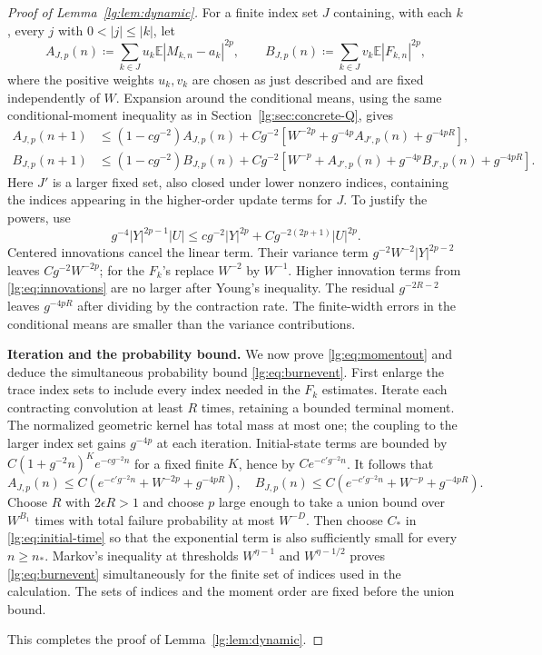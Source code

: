 \documentclass[11pt]{article}
\numberwithin{equation}{section}
\theoremstyle{remark}
\newcommand{\E}{\mathbb E}
\begin{document}
\begin{proof}[Proof of Lemma~\ref{lg:lem:dynamic}]
For a finite index set $J$ containing, with each $k$, every $j$ with
$0<|j|\le|k|$, let
\[
 A_{J,p}(n)\coloneqq\sum_{k\in J}u_k\E|M_{k,n}-a_k|^{2p},\qquad
 B_{J,p}(n)\coloneqq\sum_{k\in J}v_k\E|F_{k,n}|^{2p},
\]
where the positive weights $u_k,v_k$ are chosen as just described
and are fixed independently of $W$. Expansion around the
conditional means, using the same conditional-moment inequality
as in Section~\ref{lg:sec:concrete-Q}, gives
\begin{equation}\label{lg:eq:momentrec}
 \begin{aligned}
 A_{J,p}(n+1)&\le(1-cg^{-2})A_{J,p}(n)
   +Cg^{-2}[W^{-2p}+g^{-4p}A_{J',p}(n)+g^{-4pR}],\\
 B_{J,p}(n+1)&\le(1-cg^{-2})B_{J,p}(n)
   +Cg^{-2}[W^{-p}+A_{J',p}(n)+g^{-4p}B_{J',p}(n)
                                       +g^{-4pR}].
 \end{aligned}
\end{equation}
Here $J'$ is a larger fixed set, also closed under lower nonzero indices,
containing the indices appearing in the higher-order update terms for $J$.
To justify the powers, use
\[
 g^{-4}|Y|^{2p-1}|U|\le cg^{-2}|Y|^{2p}
                       +Cg^{-2(2p+1)}|U|^{2p}.
\]
Centered innovations cancel the linear term. Their variance term
$g^{-2}W^{-2}|Y|^{2p-2}$ leaves $Cg^{-2}W^{-2p}$;
for the $F_k$'s replace $W^{-2}$ by $W^{-1}$. Higher innovation terms from
\eqref{lg:eq:innovations} are no larger after Young's inequality.
The residual $g^{-2R-2}$ leaves $g^{-4pR}$ after dividing
by the contraction rate. The finite-width errors in the conditional
means are smaller than
the variance contributions.

\noindent\textbf{Iteration and the probability bound.}
We now prove \eqref{lg:eq:momentout} and deduce
the simultaneous probability bound \eqref{lg:eq:burnevent}.
First enlarge the trace index sets to include every index needed
in the $F_k$ estimates. Iterate each contracting convolution at least $R$ times,
retaining a bounded terminal moment. The normalized geometric
kernel has total mass at most one; the coupling to the larger index set gains
$g^{-4p}$ at each iteration. Initial-state terms are bounded
by $C(1+g^{-2} n)^K e^{-cg^{-2} n}$ for a fixed finite $K$,
hence by $Ce^{-c'g^{-2} n}$. It follows that
\begin{equation}\label{lg:eq:momentout}
 A_{J,p}(n)\le C(e^{-c'g^{-2} n}+W^{-2p}+g^{-4pR}),\quad
 B_{J,p}(n)\le C(e^{-c'g^{-2} n}+W^{-p}+g^{-4pR}).
\end{equation}
Choose $R$ with $2\epsilon R>1$
and choose $p$ large enough to take a union bound over $W^{B_1}$
times with total failure probability at most $W^{-D}$. Then choose
$C_*$ in \eqref{lg:eq:initial-time} so that the exponential term is
also sufficiently small for every $n\ge n_*$.
Markov's inequality at thresholds
$W^{\eta-1}$ and $W^{\eta-1/2}$ proves \eqref{lg:eq:burnevent}
simultaneously for the finite set of indices used in the calculation.
The sets of indices and the moment order are fixed before the
union bound.

This completes the proof of Lemma~\ref{lg:lem:dynamic}.
\end{proof}
\end{document}
